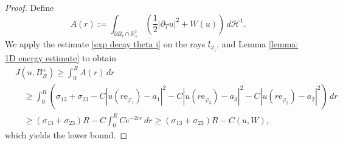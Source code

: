 \documentclass[leqno,11pt]{amsart}
\let\pa=\partial
\let\f=\frac
\let\pa=\partial
\theoremstyle{remark}
\newcommand{\BR}{\mathbb{R}}
\newcommand{\ch}{\mathcal{H}^1}
\begin{document}
\begin{proof}
Define 
\begin{equation*}\label{def Ar}
    A(r):=\int_{\pa B_r\cap\BR_+^2} \left(\f12|\pa _T u|^2+W(u)\right)\,d\ch.
\end{equation*}
We apply the estimate \eqref{exp decay theta i} on the rays $l_{\varphi_i}$, and Lemma \ref{lemma: 1D energy estimate} to obtain 
\begin{align*}
     &J(u,B_R^+)\geq \int_0^R A(r)\,dr\\
    &\quad\geq  \int_0^R \left(\sigma_{13}+\sigma_{23}- C|u(r\mathrm{e}_{\varphi_1})-a_1|^2- C|u(r\mathrm{e}_{\varphi_3})-a_3|^2- C|u(r\mathrm{e}_{\varphi_2})-a_2|^2\right)\,dr\\
    &\quad\geq (\sigma_{13}+\sigma_{23}) R- C\int_0^R Ce^{-2cr}\,dr
    \geq (\sigma_{13}+\sigma_{23}) R-C(u,W),
\end{align*}
which yields the lower bound.


\end{proof}
\end{document}
